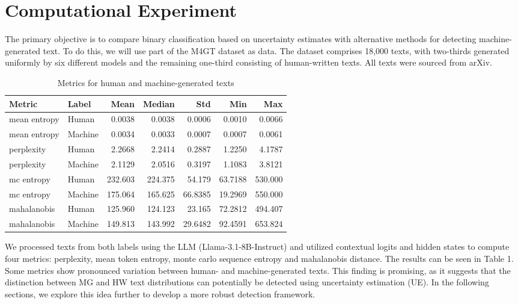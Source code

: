 \documentclass[a4paper, 12pt]{article}
\begin{document}
\section{Computational Experiment}

The primary objective is to compare binary classification based on uncertainty estimates with alternative methods for detecting machine-generated text. To do this, we will use part of the M4GT\citep{wang2024m4gt} dataset as data. The dataset comprises 18,000 texts, with two-thirds generated uniformly by six different models and the remaining one-third consisting of human-written texts. All texts were sourced from arXiv.

\begin{table}[ht]
\centering
\begin{tabular}{llrrrrr}
\toprule
\textbf{Metric} & \textbf{Label} & \textbf{Mean} & \textbf{Median} & \textbf{Std} & \textbf{Min} & \textbf{Max} \\
\midrule
mean entropy   & Human   & 0.0038   & 0.0038   & 0.0006   & 0.0010   & 0.0066   \\
mean entropy   & Machine   & 0.0034   & 0.0033   & 0.0007   & 0.0007   & 0.0061   \\
perplexity    & Human   & 2.2668   & 2.2414   & 0.2887   & 1.2250   & 4.1787   \\
perplexity    & Machine   & 2.1129   & 2.0516   & 0.3197   & 1.1083   & 3.8121   \\
mc entropy    & Human   & 232.603  & 224.375  & 54.179   & 63.7188  & 530.000  \\
mc entropy    & Machine   & 175.064  & 165.625  & 66.8385  & 19.2969  & 550.000  \\
mahalanobis   & Human   & 125.960  & 124.123  & 23.165   & 72.2812  & 494.407  \\
mahalanobis   & Machine   & 149.813  & 143.992  & 29.6482  & 92.4591  & 653.824  \\
\bottomrule
\end{tabular}
\caption{Metrics for human and machine-generated texts}
\label{tab:metric-by-label}
\end{table}


We processed texts from both labels using the LLM (Llama-3.1-8B-Instruct) and utilized contextual logits and hidden states to compute four metrics: perplexity, mean token entropy, monte carlo sequence entropy and mahalanobis distance. The results can be seen in Table 1. Some metrics show pronounced variation between human- and machine-generated texts. This finding is promising, as it suggests that the distinction between MG and HW text distributions can potentially be detected using uncertainty estimation (UE). In the following sections, we explore this idea further to develop a more robust detection framework. 
\end{document}
